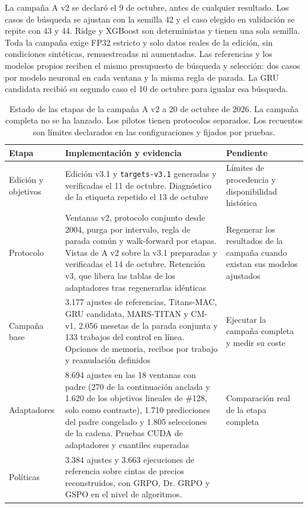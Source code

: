 \documentclass[11pt,a4paper]{report}
\begin{document}
La campaña A v2 se declaró el 9 de octubre, antes de cualquier resultado. Los
casos de búsqueda se ajustan con la semilla 42 y el caso elegido en validación
se repite con 43 y 44. Ridge y XGBoost son deterministas y tienen una sola
semilla. Toda la campaña exige FP32 estricto y solo datos reales de la
edición, sin condiciones sintéticas, remuestreadas ni aumentadas. Las
referencias y los modelos propios reciben el mismo presupuesto de búsqueda y
selección: dos casos por modelo neuronal en cada ventana y la misma regla de
parada. La GRU candidata recibió su segundo caso el 10 de octubre para igualar
esa búsqueda.

\begin{table}[htbp]
\centering
\small
\caption{Estado de las etapas de la campaña A v2 a 20 de octubre de 2026.
La campaña completa no se ha lanzado. Los pilotos tienen protocolos separados.
Los recuentos son límites declarados en las configuraciones y fijados por
pruebas.}
\label{tab:estado}
\begin{tabular}{L{2.6cm}L{5.6cm}L{4.8cm}}
\toprule
Etapa & Implementación y evidencia & Pendiente \\
\midrule
Edición y objetivos & Edición v3.1 y \texttt{targets-v3.1} generadas y
verificadas el 11 de octubre. Diagnóstico de la etiqueta repetido el 13 de
octubre & Límites de procedencia y disponibilidad histórica \\
Protocolo & Ventanas v2, protocolo conjunto desde 2004, purga por intervalo,
regla de parada común y walk-forward por etapas. Vistas de A v2 sobre la v3.1
preparadas y verificadas el 14 de octubre. Retención v3, que libera las tablas
de los adaptadores tras regenerarlas idénticas & Regenerar los resultados de
la campaña cuando existan sus modelos ajustados \\
Campaña base & 3.177 ajustes de referencias, Titans-MAC, GRU candidata,
MARS-TITAN y CM-v1, 2.056 mesetas de la parada conjunta y 133 trabajos del
control en línea. Opciones de memoria, recibos por trabajo y reanudación
definidos & Ejecutar la campaña completa y medir su coste \\
Adaptadores & 8.694 ajustes en las 18 ventanas con padre (270 de la continuación
anclada y 1.620 de los objetivos lineales de \#128, solo como contraste), 1.710 predicciones
del padre congelado y 1.805 selecciones de la cadena. Pruebas CUDA de
adaptadores y cuantiles superadas & Comparación real de la etapa completa \\
Políticas & 3.384 ajustes y 3.663 ejecuciones de referencia sobre cintas de
precios reconstruidos, con GRPO, Dr. GRPO y GSPO en el nivel de algoritmos.

\end{tabular}
\end{table}
\end{document}
